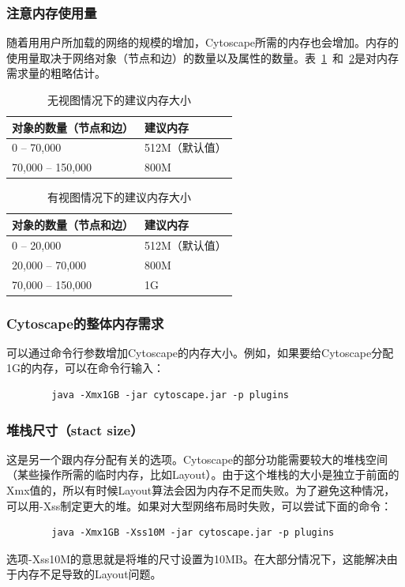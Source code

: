 		\subsubsection{注意内存使用量}

		随着用用户所加载的网络的规模的增加，Cytoscape所需的内存也会增加。内存的使用量取决于网络对象（节点和边）的数量以及属性的数量。表~\ref{table:4}~和~\ref{table:5}是对内存需求量的粗略估计。

		\begin{table}[htbp]
		\centering
		\begin{tabular}{|l|l|}
			\hline
			对象的数量（节点和边） & 建议内存\\
			\hline
			0 -- 70,000 & 512M（默认值）\\
			\hline
			70,000 -- 150,000 & 800M \\
			\hline
		\end{tabular}
		\caption{无视图情况下的建议内存大小}
		\label{table:4}
		\end{table}

		\begin{table}[htbp]
		\centering
		\begin{tabular}{|l|l|}
			\hline
			对象的数量（节点和边） & 建议内存\\
			\hline
			0 -- 20,000 & 512M（默认值）\\
			\hline
			20,000 -- 70,000 & 800M \\
			\hline
			70,000 -- 150,000 & 1G \\
			\hline
		\end{tabular}
		\caption{有视图情况下的建议内存大小}
		\label{table:5}
		\end{table}

		\subsubsection{Cytoscape的整体内存需求}
		可以通过命令行参数增加Cytoscape的内存大小。例如，如果要给Cytoscape分配1G的内存，可以在命令行输入：
		\begin{verbatim}
		java -Xmx1GB -jar cytoscape.jar -p plugins
		\end{verbatim}

		\subsubsection{堆栈尺寸（stact size）}
		这是另一个跟内存分配有关的选项。Cytoscape的部分功能需要较大的堆栈空间（某些操作所需的临时内存，比如Layout）。由于这个堆栈的大小是独立于前面的Xmx值的，所以有时候Layout算法会因为内存不足而失败。为了避免这种情况，可以用-Xss制定更大的堆。如果对大型网络布局时失败，可以尝试下面的命令：
		\begin{verbatim}
		java -Xmx1GB -Xss10M -jar cytoscape.jar -p plugins
		\end{verbatim}
		选项-Xss10M的意思就是将堆的尺寸设置为10MB。在大部分情况下，这能解决由于内存不足导致的Layout问题。

